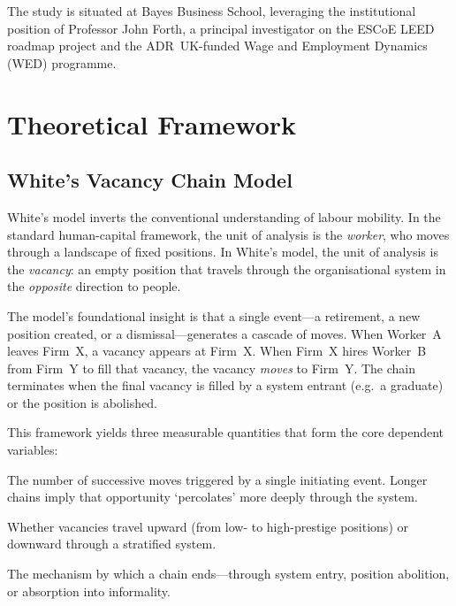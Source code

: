 \documentclass[a4paper]{tufte-handout}
\begin{document}
\noindent
The study is situated at Bayes Business School, leveraging the institutional
position of Professor John Forth, a principal investigator on the ESCoE LEED
roadmap project and the ADR~UK-funded Wage and Employment Dynamics (WED)
programme.


\section{Theoretical Framework}

\subsection{White's Vacancy Chain Model}

White's model inverts the conventional understanding of labour
mobility. In the standard human-capital framework, the
unit of analysis is the \emph{worker}, who moves through a landscape of fixed
positions. In White's model, the unit of analysis is the \emph{vacancy}: an
empty position that travels through the organisational system in the
\emph{opposite} direction to people.

The model's foundational insight is that a single event---a retirement, a new
position created, or a dismissal---generates a cascade of moves. When Worker~A
leaves Firm~X, a vacancy appears at Firm~X\@. When Firm~X hires Worker~B from
Firm~Y to fill that vacancy, the vacancy \emph{moves} to Firm~Y\@. The chain
terminates when the final vacancy is filled by a system entrant (e.g.\ a
graduate) or the position is abolished.

This framework yields three measurable quantities that form the core dependent
variables:

\begin{description}[style=nextline, font=\normalfont\itshape]
	\item[Chain Length (Multiplier)] The number of successive moves triggered by
	      a single initiating event. Longer chains imply that opportunity
	      `percolates' more deeply through the system.
	\item[Chain Direction] Whether vacancies travel upward (from low- to
	      high-prestige positions) or downward through a stratified system.
	\item[Chain Termination] The mechanism by which a chain ends---through system
	      entry, position abolition, or absorption into informality.
\end{description}
\end{document}
